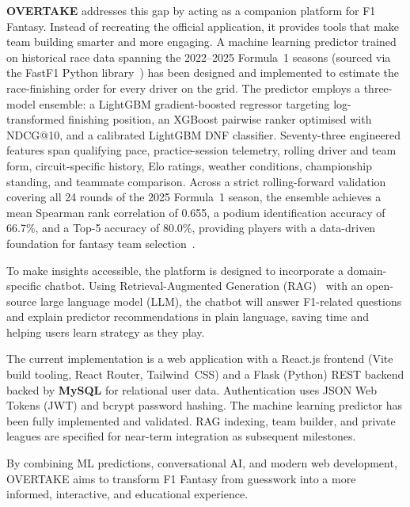 \documentclass[12pt, a4paper, oneside]{report}
\begin{document}
\textbf{OVERTAKE} addresses this gap by acting as a companion platform for F1
Fantasy. Instead of recreating the official application, it provides tools that
make team building smarter and more engaging. A machine learning predictor trained on historical race data spanning the 2022--2025
Formula~1 seasons (sourced via the FastF1 Python library~\cite{fastF1}) has been
designed and implemented to estimate the race-finishing order for every driver on
the grid. The predictor employs a three-model ensemble: a LightGBM gradient-boosted
regressor targeting log-transformed finishing position, an XGBoost pairwise ranker
optimised with NDCG@10, and a calibrated LightGBM DNF classifier. Seventy-three
engineered features span qualifying pace, practice-session telemetry, rolling driver
and team form, circuit-specific history, Elo ratings, weather conditions, championship
standing, and teammate comparison. Across a strict rolling-forward validation covering
all 24 rounds of the 2025 Formula~1 season, the ensemble achieves a mean Spearman
rank correlation of 0.655, a podium identification accuracy of 66.7\%, and a
Top-5 accuracy of 80.0\%, providing players with a data-driven foundation for
fantasy team selection~\cite{liRaceOutcomes2020}.

To make insights accessible, the platform is designed to incorporate a
domain-specific chatbot. Using Retrieval-Augmented Generation
(RAG)~\cite{lewisRAG2020} with an open-source large language model (LLM), the
chatbot will answer F1-related questions and explain predictor recommendations
in plain language, saving time and helping users learn strategy as they play.

The current implementation is a web application with a React.js frontend
(Vite build tooling, React Router, Tailwind~CSS) and a Flask (Python) REST
backend backed by \textbf{MySQL} for relational user data. Authentication uses
JSON Web Tokens (JWT) and bcrypt password hashing. The machine learning predictor has been fully implemented and validated.
RAG indexing, team builder, and private leagues are specified for near-term
integration as subsequent milestones.

By combining ML predictions, conversational AI, and modern web development,
OVERTAKE aims to transform F1 Fantasy from guesswork into a more informed,
interactive, and educational experience.

\newpage

\tableofcontents
\end{document}
